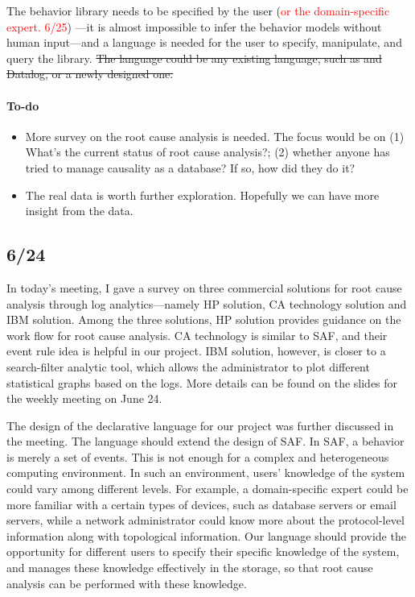 \documentclass{article}
\begin{document}
The behavior library needs to be specified by the user (\textcolor{red}{or the
  domain-specific expert. 6/25}) ---it is almost impossible
to infer the behavior models without human input---and a language is needed for
the user to specify, manipulate, and query the library. \sout{The language could be any
existing language, such as \saf{} and Datalog, or a newly designed one.}

\paragraph{To-do}
\begin{itemize}
\item More survey on the root cause analysis is needed. The focus would be on
  (1) What's the current status of root cause analysis?; (2) whether anyone has
  tried to manage causality as a database? If so, how did they do it?
\item The real data is worth further exploration. Hopefully we can have more
  insight from the data.
\end{itemize}

\subsection{6/24}
\label{sec:meeting:624}

In today's meeting, I gave a survey on three commercial solutions for root
cause analysis through log
analytics---namely HP solution, CA technology solution and IBM solution. Among
the three solutions, HP solution provides guidance on the work flow
for root cause analysis. CA technology is similar to SAF, and their event rule
idea is helpful in our project. IBM solution, however, is closer to a
search-filter analytic tool, which allows the administrator to plot different
statistical graphs based on the logs. More details can be found on the slides
for the weekly meeting on June 24.

The design of the declarative language for our project was further discussed in
the meeting. The language should extend the design of SAF. In SAF, a behavior is merely
a set of events. This is not enough for a complex and heterogeneous computing
environment. In such an environment, users' knowledge of the system could vary among different
levels. For example, a domain-specific expert could be more familiar with a
certain types of devices, such as database servers or email servers, while a
network administrator could know more about the protocol-level information along with
topological information. Our language should provide the opportunity for
different users to specify their specific knowledge of the system, and manages these
knowledge effectively in the storage, so that root cause analysis can be
performed with these knowledge.
\end{document}
